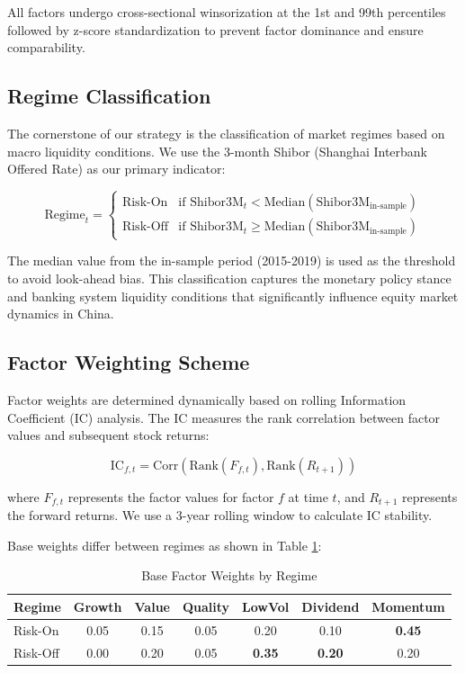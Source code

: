 \documentclass[12pt,a4paper]{article}
\begin{document}
All factors undergo cross-sectional winsorization at the 1st and 99th percentiles followed by z-score standardization to prevent factor dominance and ensure comparability.

\subsection{Regime Classification}

The cornerstone of our strategy is the classification of market regimes based on macro liquidity conditions. We use the 3-month Shibor (Shanghai Interbank Offered Rate) as our primary indicator:

\begin{equation}
\text{Regime}_t = \begin{cases}
\text{Risk-On} & \text{if } \text{Shibor3M}_t < \text{Median}(\text{Shibor3M}_{\text{in-sample}}) \\
\text{Risk-Off} & \text{if } \text{Shibor3M}_t \geq \text{Median}(\text{Shibor3M}_{\text{in-sample}})
\end{cases}
\end{equation}

The median value from the in-sample period (2015-2019) is used as the threshold to avoid look-ahead bias. This classification captures the monetary policy stance and banking system liquidity conditions that significantly influence equity market dynamics in China.

\subsection{Factor Weighting Scheme}

Factor weights are determined dynamically based on rolling Information Coefficient (IC) analysis. The IC measures the rank correlation between factor values and subsequent stock returns:

\begin{equation}
\text{IC}_{f,t} = \text{Corr}\left(\text{Rank}(F_{f,t}), \text{Rank}(R_{t+1})\right)
\end{equation}

where $F_{f,t}$ represents the factor values for factor $f$ at time $t$, and $R_{t+1}$ represents the forward returns. We use a 3-year rolling window to calculate IC stability.

Base weights differ between regimes as shown in Table \ref{tab:factor_weights}:

\begin{table}[H]
\centering
\caption{Base Factor Weights by Regime}
\label{tab:factor_weights}
\begin{tabular}{@{}lcccccc@{}}
\toprule
\textbf{Regime} & \textbf{Growth} & \textbf{Value} & \textbf{Quality} & \textbf{LowVol} & \textbf{Dividend} & \textbf{Momentum} \\
\midrule
Risk-On & 0.05 & 0.15 & 0.05 & 0.20 & 0.10 & \textbf{0.45} \\
Risk-Off & 0.00 & 0.20 & 0.05 & \textbf{0.35} & \textbf{0.20} & 0.20 \\
\bottomrule
\end{tabular}
\end{table}
\end{document}
